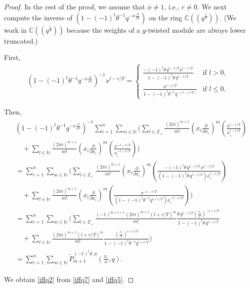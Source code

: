 \documentclass[10pt,a4paper]{amsart}
\begin{document}
\begin{proof}
In the rest of the proof, we assume that \( \phi \neq 1 \), i.e., \( r \neq 0 \).  
We next compute the inverse of \( \left(1 - (-1)^{t} \theta^{-1} q^{-x\frac{\partial}{\partial x}} \right) \) on the ring \( \mathbb{C}((q^{\frac{1}{T}})) \).  
(We work in \( \mathbb{C}((q^{\frac{1}{T}})) \) because the weights of a \( g \)-twisted module are always lower truncated.)

 First, 
\begin{align}\label{iffq6}
  \left(1 - (-1)^{t} \theta^{-1} q^{-x\frac{\partial}{\partial x}} \right)^{-1} x^{l - r/T}
  =
  \begin{cases}
    \displaystyle\frac{-(-1)^{t} \theta\, q^{l - r/T} x^{l - r/T}}{1 - (-1)^{t} \theta\, q^{l - r/T}} & \text{if } l > 0,\\[1ex]
    \displaystyle\frac{x^{l - r/T}}{1 - (-1)^{t} \theta^{-1} q^{-(l - r/T)}} & \text{if } l \leq 0.
  \end{cases}
\end{align}

Then,
\begin{align}\label{iffq7}
\begin{split}
  &\left(1 - (-1)^t \theta^{-1} q^{-x\frac{\partial}{\partial x}}\right)^{-1}
  \sum_{i=1}^{n} \sum_{m \in \mathbb{N}} \Bigg(
    \sum_{l \in \mathbb{Z}_+}
    \frac{(2\pi i)^{m+1}}{m!}
    \left(x_i \frac{\partial}{\partial x_i}\right)^m
    \left(\frac{x^{l - r/T}}{x_i^{l - r/T}}\right) \\
  &\quad +
    \sum_{l \in \mathbb{N}}
    \frac{(2\pi i)^{m+1}}{m!}
    \left(x_i \frac{\partial}{\partial x_i}\right)^m
    \left(\frac{x^{-l - r/T}}{x_i^{-l - r/T}}\right)
  \Bigg)\\
  &=
  \sum_{i=1}^{n} \sum_{m \in \mathbb{N}} \Bigg(
    \sum_{l \in \mathbb{Z}_+}
    \frac{(2\pi i)^{m+1}}{m!}
    \left(x_i \frac{\partial}{\partial x_i}\right)^m
    \left(
      \frac{-(-1)^t \theta\, q^{l - r/T}\, x^{l - r/T}}{(1 - (-1)^t \theta\, q^{l - r/T}) x_i^{l - r/T}}
    \right)\\
  &\quad +
    \sum_{l \in \mathbb{N}}
    \frac{(2\pi i)^{m+1}}{m!}
    \left(x_i \frac{\partial}{\partial x_i}\right)^m
    \left(
      \frac{x^{-l - r/T}}{(1 - (-1)^t \theta^{-1} q^{l + r/T}) x_i^{-l - r/T}}
    \right)
  \Bigg)\\
  &=
  \sum_{i=1}^{n} \sum_{m \in \mathbb{N}} \Bigg(
    \sum_{l \in \mathbb{Z}_+}
    \frac{(-1)^{m + t + 1} (2\pi i)^{m+1} (l + r/T)^m}{m!}
    \frac{\theta\, q^{l - r/T} \left(\frac{x_i}{x}\right)^{-l + r/T}}{1 - (-1)^t \theta\, q^{l - r/T}}\\
  &\quad +
    \sum_{l \in \mathbb{N}}
    \frac{(2\pi i)^{m+1} (l + r/T)^m}{m!}
    \frac{\left(\frac{x_i}{x}\right)^{l + r/T}}{1 - (-1)^t \theta^{-1} q^{l + r/T}}
  \Bigg)\\
  &= \sum_{i=1}^{n} \sum_{m \in \mathbb{N}} \tilde{P}_{m+1}^{(-1)^t \theta, \phi}\left(\frac{x_i}{x}, q\right).
\end{split}
\end{align}

We obtain \eqref{iffq2} from \eqref{iffq7} and \eqref{iffq5}.

\end{proof}
\end{document}
